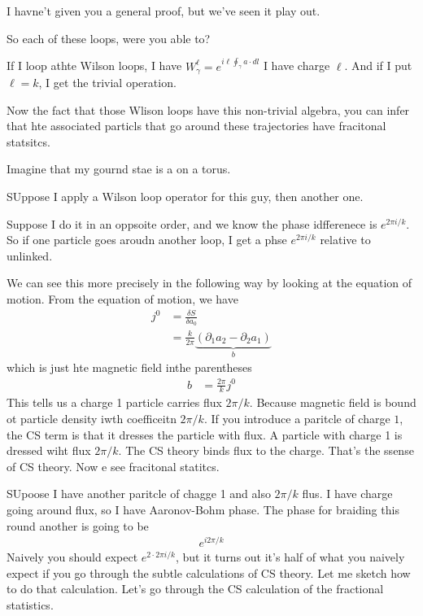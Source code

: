 I havne't given you a general proof,
but we've seen it play out.

\begin{question}
    So each of these loops,
    were you able to?
\end{question}
If I loop athte Wilson loops,
I have $W_\gamma^{\ell} = e^{i\ell \oint_\gamma a\cdot dl}$
I have charge $\ell$.
And if I put $\ell=k$,
I get the trivial operation.

Now the fact that those Wlison loops have this non-trivial algebra,
you can infer that hte associated particls that go around these trajectories
have fracitonal statsitcs.

Imagine that my gournd stae is a on a torus.

SUppose I apply a Wilson loop operator for this guy,
then another one.

Suppose I do it in an oppsoite order,
and we know the phase idfferenece is $e^{2\pi i/k}$.
So if one particle goes aroudn another loop,
I get a phse $e^{2\pi i/k}$ relative to unlinked.

We can see this more precisely in the following way by looking at the equation
of motion.
From the equation of motion,
we have
\begin{align}
    j^0 &=
    \frac{\delta S}{\delta a_0}
    \\
    &=
    \frac{k}{2\pi}
    \underbrace{\left( \partial_1 a_2 - \partial_2 a_1 \right)}_{b}
\end{align}
which is just hte magnetic field inthe parentheses
\begin{align}
    b &= \frac{2\pi}{k}j^0
\end{align}
This tells us a charge 1 particle carries flux $2\pi/k$.
Because magnetic field is bound ot particle density iwth coefficeitn $2\pi/k$.
If you introduce a paritcle of charge $1$,
the CS term is that it dresses the particle with flux.
A particle with charge 1 is dressed wiht flux $2\pi /k$.
The CS theory binds flux to the charge.
That's the ssense of CS theory.
Now e see fracitonal statitcs.

SUpoose I have another paritcle of chagge 1 and also $2\pi/k$ flus.
I have charge going around flux,
so I have Aaronov-Bohm phase.
The phase for braiding this round another is going to be
\begin{align}
    e^{i2\pi/k}
\end{align}
Naively you should expect $e^{2\cdot 2\pi i/k}$,
but it turns out it's half of what you naively expect if you go through the
subtle calculations of CS theory.
Let me sketch how to do that calculation.
Let's go through the CS calculation of the fractional statistics.

